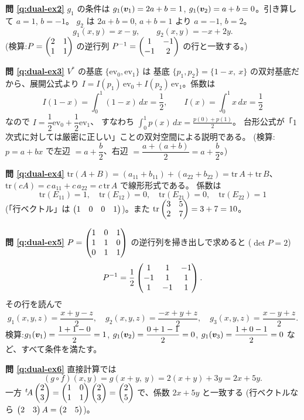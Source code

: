 \bigskip
\noindent\textbf{問 \ref{q:dual-ex2}}\quad
$g_1$ の条件は $g_1(\bm{v}_1) = 2a + b = 1$,
$g_1(\bm{v}_2) = a + b = 0$。引き算して $a = 1$, $b = -1$。
$g_2$ は $2a + b = 0$, $a + b = 1$ より $a = -1$, $b = 2$。
\[
g_1(x, y) = x - y, \qquad g_2(x, y) = -x + 2y.
\]
(検算:$P = \begin{pmatrix}2 & 1 \\ 1 & 1\end{pmatrix}$ の逆行列
$P^{-1} = \begin{pmatrix}1 & -1 \\ -1 & 2\end{pmatrix}$ の行と一致する。)

\bigskip
\noindent\textbf{問 \ref{q:dual-ex3}}\quad
$V^{*}$ の基底 $\{\mathrm{ev}_0, \mathrm{ev}_1\}$ は
基底 $\{p_1, p_2\} = \{1 - x,\ x\}$ の双対基底だから、展開公式より
$I = I(p_1)\,\mathrm{ev}_0 + I(p_2)\,\mathrm{ev}_1$。係数は
\[
I(1 - x) = \int_0^1 (1 - x)\,dx = \frac{1}{2}, \qquad
I(x) = \int_0^1 x\,dx = \frac{1}{2}
\]
なので $I = \dfrac{1}{2}\mathrm{ev}_0 + \dfrac{1}{2}\mathrm{ev}_1$、
すなわち $\displaystyle\int_0^1 p(x)\,dx = \frac{p(0) + p(1)}{2}$。
台形公式が「$1$ 次式に対しては厳密に正しい」ことの双対空間による説明である。
(検算:$p = a + bx$ で左辺 $= a + \dfrac{b}{2}$、右辺
$= \dfrac{a + (a + b)}{2} = a + \dfrac{b}{2}$。)

\bigskip
\noindent\textbf{問 \ref{q:dual-ex4}}\quad
$\mathrm{tr}(A + B) = (a_{11} + b_{11}) + (a_{22} + b_{22})
= \mathrm{tr}\,A + \mathrm{tr}\,B$、
$\mathrm{tr}(cA) = c\,a_{11} + c\,a_{22} = c\,\mathrm{tr}\,A$ で線形形式である。
係数は
\[
\mathrm{tr}(E_{11}) = 1, \quad \mathrm{tr}(E_{12}) = 0, \quad
\mathrm{tr}(E_{21}) = 0, \quad \mathrm{tr}(E_{22}) = 1
\]
(「行ベクトル」は $\begin{pmatrix}1 & 0 & 0 & 1\end{pmatrix}$)。また
$\mathrm{tr}\begin{pmatrix}3 & 5 \\ 2 & 7\end{pmatrix} = 3 + 7 = 10$。

\bigskip
\noindent\textbf{問 \ref{q:dual-ex5}}\quad
$P = \begin{pmatrix}1 & 0 & 1 \\ 1 & 1 & 0 \\ 0 & 1 & 1\end{pmatrix}$ の逆行列を掃き出しで求めると
($\det P = 2$)
\[
P^{-1} = \frac{1}{2}\begin{pmatrix}1 & 1 & -1 \\ -1 & 1 & 1 \\ 1 & -1 & 1\end{pmatrix}.
\]
その行を読んで
\[
g_1(x, y, z) = \frac{x + y - z}{2}, \quad
g_2(x, y, z) = \frac{-x + y + z}{2}, \quad
g_3(x, y, z) = \frac{x - y + z}{2}.
\]
検算:$g_1(\bm{v}_1) = \dfrac{1 + 1 - 0}{2} = 1$,
$g_1(\bm{v}_2) = \dfrac{0 + 1 - 1}{2} = 0$,
$g_1(\bm{v}_3) = \dfrac{1 + 0 - 1}{2} = 0$ など、すべて条件を満たす。

\bigskip
\noindent\textbf{問 \ref{q:dual-ex6}}\quad
直接計算では
\[
(g \circ f)(x, y) = g(x + y,\ y) = 2(x + y) + 3y = 2x + 5y.
\]
一方 ${}^t\!A\begin{pmatrix}2 \\ 3\end{pmatrix} = \begin{pmatrix}1 & 0 \\ 1 & 1\end{pmatrix}\begin{pmatrix}2 \\ 3\end{pmatrix}
= \begin{pmatrix}2 \\ 5\end{pmatrix}$ で、係数 $2x + 5y$ と一致する
(行ベクトルなら $\begin{pmatrix}2 & 3\end{pmatrix}A = \begin{pmatrix}2 & 5\end{pmatrix}$)。


